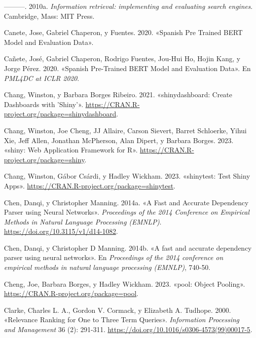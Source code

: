 \documentclass[
  12pt,
  openany]{book}
\newlength{\cslhangindent}
\newlength{\cslentryspacingunit} %
\newenvironment{CSLReferences}[2] %
 {%
  \setlength{\parindent}{0pt}
  \ifodd #1
  \let\oldpar\par
  \def\par{\hangindent=\cslhangindent\oldpar}
  \fi
  \setlength{\parskip}{#2\cslentryspacingunit}
 }%
 {}
\begin{document}
\begin{CSLReferences}{1}{0}
\leavevmode{}%
---------. 2010a. \emph{Information retrieval: implementing and evaluating search engines}. Cambridge, Mass: MIT Press.

\leavevmode{}%
Canete, Jose, Gabriel Chaperon, y Fuentes. 2020. {«Spanish Pre Trained BERT Model and Evaluation Data»}.

\leavevmode{}%
Cañete, José, Gabriel Chaperon, Rodrigo Fuentes, Jou-Hui Ho, Hojin Kang, y Jorge Pérez. 2020. {«Spanish Pre-Trained BERT Model and Evaluation Data»}. En \emph{PML4DC at ICLR 2020}.

\leavevmode{}%
Chang, Winston, y Barbara Borges Ribeiro. 2021. {«shinydashboard: Create Dashboards with 'Shiny'»}. \url{https://CRAN.R-project.org/package=shinydashboard}.

\leavevmode{}%
Chang, Winston, Joe Cheng, JJ Allaire, Carson Sievert, Barret Schloerke, Yihui Xie, Jeff Allen, Jonathan McPherson, Alan Dipert, y Barbara Borges. 2023. {«shiny: Web Application Framework for R»}. \url{https://CRAN.R-project.org/package=shiny}.

\leavevmode{}%
Chang, Winston, Gábor Csárdi, y Hadley Wickham. 2023. {«shinytest: Test Shiny Apps»}. \url{https://CRAN.R-project.org/package=shinytest}.

\leavevmode{}%
Chen, Danqi, y Christopher Manning. 2014a. {«A Fast and Accurate Dependency Parser using Neural Networks»}. \emph{Proceedings of the 2014 Conference on Empirical Methods in Natural Language Processing (EMNLP)}. \url{https://doi.org/10.3115/v1/d14-1082}.

\leavevmode{}%
Chen, Danqi, y Christopher D Manning. 2014b. {«A fast and accurate dependency parser using neural networks»}. En \emph{Proceedings of the 2014 conference on empirical methods in natural language processing (EMNLP)}, 740-50.

\leavevmode{}%
Cheng, Joe, Barbara Borges, y Hadley Wickham. 2023. {«pool: Object Pooling»}. \url{https://CRAN.R-project.org/package=pool}.

\leavevmode{}%
Clarke, Charles L. A., Gordon V. Cormack, y Elizabeth A. Tudhope. 2000. {«Relevance Ranking for One to Three Term Queries»}. \emph{Information Processing and Management} 36 (2): 291-311. \url{https://doi.org/10.1016/s0306-4573(99)00017-5}.


\end{CSLReferences}
\end{document}
